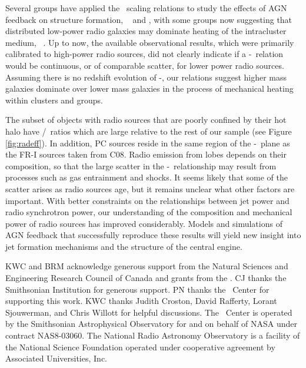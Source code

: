 \documentclass[12pt, preprint]{aastex}
\begin{document}
Several groups have applied the \birzan\ scaling relations to study
the effects of AGN feedback on structure formation,
\eg\ \citet{best07} and \citet{2007MNRAS.379..260M}, with some groups
now suggesting that distributed low-power radio galaxies may dominate
heating of the intracluster medium,
\eg\ \citet{2009ApJ...705..854H}. Up to now, the available
observational results, which were primarily calibrated to high-power
radio sources, did not clearly indicate if a \pjet-\prad\ relation
would be continuous, or of comparable scatter, for lower power radio
sources. Assuming there is no redshift evolution of \pjet-\prad, our
relations suggest higher mass galaxies dominate over lower mass
galaxies in the process of mechanical heating within clusters and
groups.

The subset of objects with radio sources that are poorly confined by
their hot halo have \prad/\pjet\ ratios which are large relative to
the rest of our sample (see Figure \ref{fig:radeff}). In addition, PC
sources reside in the same region of the \pjet-\prad\ plane as the
FR-I sources taken from C08. Radio emission from lobes depends on
their composition, so that the large scatter in the
\pjet-\prad\ relationship may result from processes such as gas
entrainment and shocks. It seems likely that some of the scatter
arises as radio sources age, but it remains unclear what other factors
are important. With better constraints on the relationships between
jet power and radio synchrotron power, our understanding of the
composition and mechanical power of radio sources has improved
considerably. Models and simulations of AGN feedback that successfully
reproduce these results will yield new insight into jet formation
mechanisms and the structure of the central engine.

\acknowledgements

KWC and BRM acknowledge generous support from the Natural Sciences and
Engineering Research Council of Canada and grants from the \cxo. CJ
thanks the Smithsonian Institution for generous support. PN thanks the
\cxo\ Center for supporting this work. KWC thanks Judith Croston,
David Rafferty, Lorant Sjouwerman, and Chris Willott for helpful
discussions. The \cxo\ Center is operated by the Smithsonian
Astrophysical Observatory for and on behalf of NASA under contract
NAS8-03060. The National Radio Astronomy Observatory is a facility of
the National Science Foundation operated under cooperative agreement
by Associated Universities, Inc.
\end{document}
